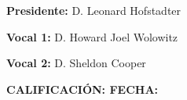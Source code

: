 \vspace{2.0cm}
\textbf{\Large Presidente:}{\Large{} D. Leonard Hofstadter}{\Large \par}

\vspace{2.0cm}
\textbf{\Large Vocal 1:}{\Large{} D. Howard Joel Wolowitz}{\Large \par}

\vspace{2.0cm}
\textbf{\Large Vocal 2:}{\Large{} D. Sheldon Cooper}{\Large \par}

\vspace{0.8cm}
\textbf{ CALIFICACIÓN: \hspace{6cm}FECHA:}{ \par}



